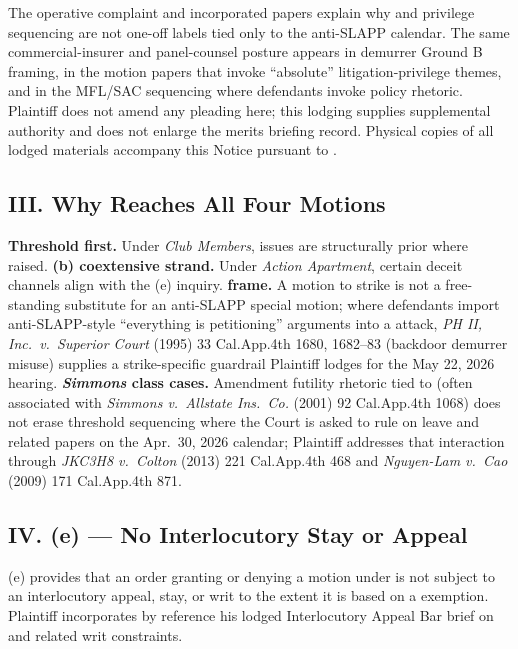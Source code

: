The operative complaint and incorporated papers explain why  and privilege sequencing are not one-off labels tied only to the anti-SLAPP calendar. The same commercial-insurer and panel-counsel posture appears in demurrer Ground B framing, in the  motion papers that invoke ``absolute'' litigation-privilege themes, and in the MFL/SAC sequencing where defendants invoke  policy rhetoric. Plaintiff does not amend any pleading here; this lodging supplies supplemental authority and does not enlarge the merits briefing record. Physical copies of all lodged materials accompany this Notice pursuant to .

\subsection*{III. Why  Reaches All Four Motions}

\textbf{Threshold first.} Under \textit{Club Members},  issues are structurally prior where raised. \textbf{(b) coextensive strand.} Under \textit{Action Apartment}, certain deceit channels align with the (e) inquiry. \textbf{ frame.} A  motion to strike is not a free-standing substitute for an anti-SLAPP special motion; where defendants import anti-SLAPP-style ``everything is petitioning'' arguments into a  attack, \textit{PH II, Inc.\ v.\ Superior Court} (1995) 33 Cal.App.4th 1680, 1682--83 (backdoor demurrer misuse) supplies a strike-specific guardrail Plaintiff lodges for the May 22, 2026 hearing. \textbf{\textit{Simmons} class cases.} Amendment futility rhetoric tied to  (often associated with \textit{Simmons v.\ Allstate Ins.\ Co.} (2001) 92 Cal.App.4th 1068) does not erase threshold  sequencing where the Court is asked to rule on leave and related papers on the Apr.\ 30, 2026 calendar; Plaintiff addresses that interaction through \textit{JKC3H8 v.\ Colton} (2013) 221 Cal.App.4th 468 and \textit{Nguyen-Lam v.\ Cao} (2009) 171 Cal.App.4th 871.

\subsection*{IV. (e) --- No Interlocutory Stay or Appeal}

(e) provides that an order granting or denying a motion under  is not subject to an interlocutory appeal, stay, or writ to the extent it is based on a  exemption. Plaintiff incorporates by reference his lodged Interlocutory Appeal Bar brief on  and related writ constraints.

